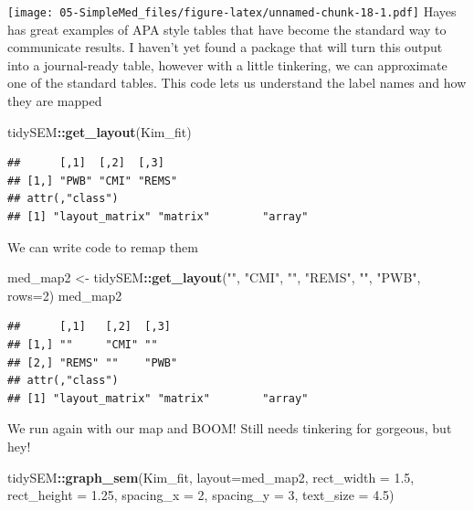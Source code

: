 \documentclass[
  11pt,
]{book}
\newenvironment{Shaded}{\begin{snugshade}}{\end{snugshade}}
\newcommand{\AttributeTok}[1]{\textcolor[rgb]{0.27,0.27,0.27}{#1}}
\newcommand{\DecValTok}[1]{\textcolor[rgb]{0.06,0.06,0.06}{#1}}
\newcommand{\FloatTok}[1]{\textcolor[rgb]{0.06,0.06,0.06}{#1}}
\newcommand{\FunctionTok}[1]{\textcolor[rgb]{0.27,0.27,0.27}{\textbf{#1}}}
\newcommand{\NormalTok}[1]{#1}
\newcommand{\OtherTok}[1]{\textcolor[rgb]{0.37,0.37,0.37}{#1}}
\newcommand{\SpecialCharTok}[1]{\textcolor[rgb]{0.43,0.43,0.43}{\textbf{#1}}}
\newcommand{\StringTok}[1]{\textcolor[rgb]{0.5,0.5,0.5}{#1}}
\begin{document}
\texttt{[image: 05-SimpleMed\_files/figure-latex/unnamed-chunk-18-1.pdf]} Hayes has great examples of APA style tables that have become the standard way to communicate results. I haven't yet found a package that will turn this output into a journal-ready table, however with a little tinkering, we can approximate one of the standard tables. This code lets us understand the label names and how they are mapped

\begin{Shaded}
\begin{Highlighting}[]
\NormalTok{tidySEM}\SpecialCharTok{::}\FunctionTok{get\_layout}\NormalTok{(Kim\_fit)}
\end{Highlighting}
\end{Shaded}

\begin{verbatim}
##      [,1]  [,2]  [,3]  
## [1,] "PWB" "CMI" "REMS"
## attr(,"class")
## [1] "layout_matrix" "matrix"        "array"
\end{verbatim}

We can write code to remap them

\begin{Shaded}
\begin{Highlighting}[]
\NormalTok{med\_map2 }\OtherTok{\textless{}{-}}\NormalTok{ tidySEM}\SpecialCharTok{::}\FunctionTok{get\_layout}\NormalTok{(}\StringTok{""}\NormalTok{, }\StringTok{"CMI"}\NormalTok{, }\StringTok{""}\NormalTok{,}
                               \StringTok{"REMS"}\NormalTok{, }\StringTok{""}\NormalTok{, }\StringTok{"PWB"}\NormalTok{, }\AttributeTok{rows=}\DecValTok{2}\NormalTok{)}
\NormalTok{med\_map2}
\end{Highlighting}
\end{Shaded}

\begin{verbatim}
##      [,1]   [,2]  [,3] 
## [1,] ""     "CMI" ""   
## [2,] "REMS" ""    "PWB"
## attr(,"class")
## [1] "layout_matrix" "matrix"        "array"
\end{verbatim}

We run again with our map and BOOM! Still needs tinkering for gorgeous, but hey!

\begin{Shaded}
\begin{Highlighting}[]
\NormalTok{tidySEM}\SpecialCharTok{::}\FunctionTok{graph\_sem}\NormalTok{(Kim\_fit, }\AttributeTok{layout=}\NormalTok{med\_map2,  }\AttributeTok{rect\_width =} \FloatTok{1.5}\NormalTok{, }\AttributeTok{rect\_height =} \FloatTok{1.25}\NormalTok{, }\AttributeTok{spacing\_x =} \DecValTok{2}\NormalTok{, }\AttributeTok{spacing\_y =} \DecValTok{3}\NormalTok{, }\AttributeTok{text\_size =} \FloatTok{4.5}\NormalTok{)}
\end{Highlighting}
\end{Shaded}
\end{document}
